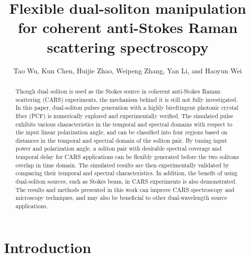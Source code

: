 \documentclass{osa-article}
\begin{document}
\title{Flexible dual-soliton manipulation for coherent anti-Stokes Raman scattering spectroscopy}

\author{Tao Wu, Kun Chen, Huijie Zhao, Weipeng Zhang, Yan Li, and Haoyun Wei}

\address{State Key Lab of Precision Measurement Technology and Instrument, Department of Precision Instrument, Tsinghua University, Beijing 100084, China\\
Department of Chemistry, University of California, Berkeley, CA 74920, USA} 



\begin{abstract}
Though dual soliton is used as the Stokes source in coherent anti-Stokes Raman scattering (CARS) experiments, the mechanism behind it is still not fully investigated. In this paper, dual-soliton pulses generation with a highly birefringent photonic crystal fiber (PCF) is numerically explored and experimentally verified. The simulated pulse exhibits various characteristics in the temporal and spectral domains with respect to the input linear polarization angle, and can be classified into four regions based on distances in the temporal and spectral domain of the soliton pair. By tuning input power and polarization angle, a soliton pair with desirable spectral coverage and temporal delay for CARS applications can be flexibly generated before the two solitons overlap in time domain. The simulated results are then experimentally validated by comparing their temporal and spectral characteristics. In addition, the benefit of using dual-soliton sources, such as Stokes beam, in CARS experiments is also demonstrated. The results and methods presented in this work can improve CARS spectroscopy and microscopy techniques, and may also be beneficial to other dual-wavelength source applications.
\end{abstract}


\section{Introduction}
\end{document}
